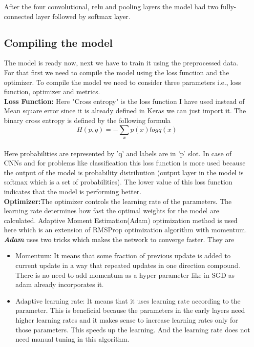 \noindent After the four convolutional, relu and pooling layers the model had two fully-connected layer followed by softmax layer.

\subsection{Compiling the model}
The model is ready now, next we have to train it using the preprocessed data. For that first we need to compile the model using the loss function and the optimizer. To compile the model we need to consider three parameters i.e., loss function, optimizer and metrics. \\
 \textbf{Loss Function:}
Here "Cross entropy" is the loss function I have used instead of Mean square error since it is already defined in Keras we can just import it. The binary cross entropy is defined by the following formula\\$$H(p,q) = -\sum_{x}p(x)log q(x) $$ \\
Here probabilities are represented by 'q' and labels are in 'p' slot. In case of CNNs and for problems like classification this loss function is more used because the output of the model is probability distribution (output layer in the model is softmax which is a set of probabilities). The lower value of this loss function indicates that the model is performing better.\\
\textbf{Optimizer:}The optimizer controls the learning rate of the parameters. The learning rate determines how fast the optimal weights for the model are calculated. Adaptive Moment Estimation(Adam) \cite{Diederik} optimization method is used here which is an extension of RMSProp optimization algorithm with momentum. \\
\noindent\textbf{\textit{Adam}} uses two tricks which makes the network to converge faster. \cite{Diederik} They are \begin{itemize}
    \item Momentum: It means that some fraction of previous update is added to current update in a way that repeated updates in one direction compound. There is no need to add momentum as a hyper parameter like in SGD as adam already incorporates it.
    \item Adaptive learning rate: It means that it uses learning rate according to the parameter. This is beneficial because the parameters in the early layers need higher learning rates and it makes sense to increase learning rates only for those parameters. This speeds up the learning. And the learning rate does not need manual tuning in this algorithm. 
\end{itemize}
